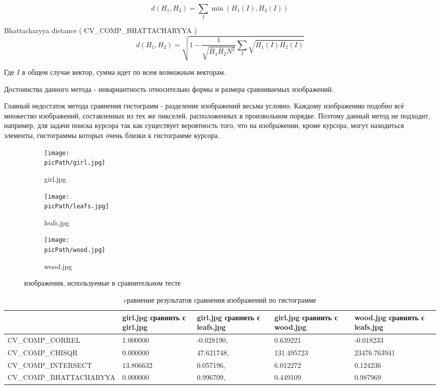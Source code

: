 \documentclass[oneside,final,14pt]{extreport}
\newcommand{\picPath}{pictures}
\begin{document}
$$
d(H_1,H_2)
=
\sum_I 
\min (H_1(I),H_2(I))
$$

Bhattacharyya distance ( CV\_COMP\_BHATTACHARYYA )
$$
d(H_1,H_2)
=
\sqrt{ 1 - 
\frac{1}{
  \sqrt{\overline{H}_1 
  		\overline{H}_2
  		N^2}
  }
  \sum_I
  \sqrt{H_1(I) H_2(I)}
}
$$

Где $I$ в общем случае вектор, сумма идет по всем возможным векторам.


Достоинства данного метода - инвариантность относительно формы и размера сравниваемых изображений.

Главный недостаток метода сравнения гистограмм -   разделение изображений весьма условно. Каждому изображению подобно всё множество изображений, составленных из тех же пикселей, расположенных в произвольном порядке. Поэтому данный метод не подходит, например,  для задачи поиска курсора так как существует вероятность того, что на изображении, кроме курсора, могут находиться элементы, гистограммы которых очень близки к гистограмме курсора.   

\begin{figure}[H]
\begin{center}
\begin{subfigure}[b]{0.2\linewidth}
    	\texttt{[image: \\picPath/girl.jpg]}
    	\caption{ girl.jpg}
  \end{subfigure}
  \begin{subfigure}[b]{0.3\linewidth}
    	\texttt{[image: \\picPath/leafs.jpg]}
    	\caption{ leafs.jpg}
  \end{subfigure}
  \begin{subfigure}[b]{0.3\linewidth}
    	\texttt{[image: \\picPath/wood.jpg]}
    	\caption{ wood.jpg}
  \end{subfigure}
\end{center}
  \caption{изображения, используемые в сравнительном тесте  }
  \label{hist:pics}
\end{figure}

\begin{table}[H] 
\caption{cравнение результатов сравнения изображений по гистограмме}
\label{hist:comparison}
\begin{tabularx}{\textwidth}{|X|X|X|X|X|}
\hline
 & 
girl.jpg сравнить с girl.jpg
&
girl.jpg сравнить с leafs.jpg
&
girl.jpg сравнить с wood.jpg
&
wood.jpg сравнить с leafs.jpg
\\
\hline
CV\_\allowbreak COMP\_\allowbreak CORREL
&
 1.000000
& 
 -0.028190, 
&
0.639221
&
-0.018233
\\
\hline
CV\_\allowbreak COMP\_\allowbreak CHISQR
&
0.000000
&
 47.621748, 
&
131.495723
&
23476.763941
\\
\hline
CV\_\allowbreak COMP\_\allowbreak INTERSECT
&
13.806632
&
0.057196, 
&
6.012272
&
 0.124236
\\
\hline
CV\_\allowbreak COMP\_\allowbreak BHATTA\allowbreak CHARYYA
&
 0.000000
&
0.996709, 
&
0.449109
&
0.987969
\\
\hline
\end{tabularx}
\end{table}
\end{document}
